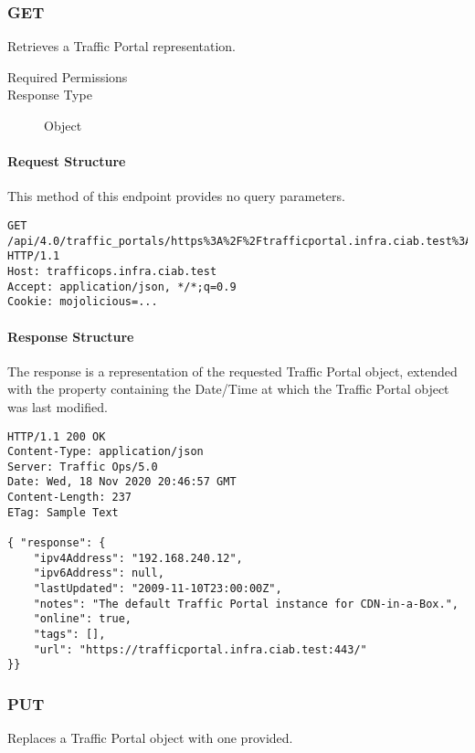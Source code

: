 \subsubsection{GET}
Retrieves a Traffic Portal representation.
\begin{description}
	\item[Required Permissions] 
	\item[Response Type] Object
\end{description}

\paragraph{Request Structure}
This method of this endpoint provides no query parameters.

\begin{codelisting}
\begin{verbatim}
GET /api/4.0/traffic_portals/https%3A%2F%2Ftrafficportal.infra.ciab.test%3A443 HTTP/1.1
Host: trafficops.infra.ciab.test
Accept: application/json, */*;q=0.9
Cookie: mojolicious=...

\end{verbatim}
\end{codelisting}

\paragraph{Response Structure}
The response is a representation of the requested Traffic Portal object,
extended with the  property containing the Date/Time at which
the Traffic Portal object was last modified.

\begin{codelisting}
\begin{verbatim}
HTTP/1.1 200 OK
Content-Type: application/json
Server: Traffic Ops/5.0
Date: Wed, 18 Nov 2020 20:46:57 GMT
Content-Length: 237
ETag: Sample Text

{ "response": {
	"ipv4Address": "192.168.240.12",
	"ipv6Address": null,
	"lastUpdated": "2009-11-10T23:00:00Z",
	"notes": "The default Traffic Portal instance for CDN-in-a-Box.",
	"online": true,
	"tags": [],
	"url": "https://trafficportal.infra.ciab.test:443/"
}}
\end{verbatim}
\end{codelisting}

\subsubsection{PUT}
Replaces a Traffic Portal object with one provided.

